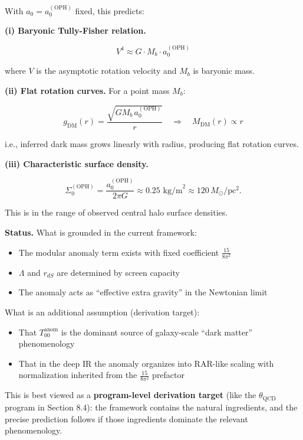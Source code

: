 \documentclass[
]{article}
\providecommand{\tightlist}{%
  \setlength{\itemsep}{0pt}\setlength{\parskip}{0pt}}
\begin{document}
With \(a_0 = a_0^{\mathrm{(OPH)}}\) fixed, this predicts:

\textbf{(i) Baryonic Tully-Fisher relation.}

\[
V^4 \approx G \cdot M_b \cdot a_0^{\mathrm{(OPH)}}
\]

where \(V\) is the asymptotic rotation velocity and \(M_b\) is baryonic
mass.

\textbf{(ii) Flat rotation curves.} For a point mass \(M_b\):

\[
g_{\mathrm{DM}}(r) = \frac{\sqrt{G M_b \, a_0^{\mathrm{(OPH)}}}}{r}
\quad \Rightarrow \quad
M_{\mathrm{DM}}(r) \propto r
\]

i.e., inferred dark mass grows linearly with radius, producing flat
rotation curves.

\textbf{(iii) Characteristic surface density.}

\[
\Sigma_0^{\mathrm{(OPH)}} = \frac{a_0^{\mathrm{(OPH)}}}{2\pi G}
\approx 0.25 \text{ kg/m}^2 \approx 120 \, M_\odot/\text{pc}^2.
\]

This is in the range of observed central halo surface densities.

\textbf{Status.} What is grounded in the current framework:

\begin{itemize}
\tightlist
\item
  The modular anomaly term exists with fixed coefficient
  \(\frac{15}{8\pi^2}\)
\item
  \(\Lambda\) and \(r_{dS}\) are determined by screen capacity
\item
  The anomaly acts as ``effective extra gravity'' in the Newtonian limit
\end{itemize}

What is an additional assumption (derivation target):

\begin{itemize}
\tightlist
\item
  That \(T_{00}^{\mathrm{anom}}\) is the dominant source of galaxy-scale
  ``dark matter'' phenomenology
\item
  That in the deep IR the anomaly organizes into RAR-like scaling with
  normalization inherited from the \(\frac{15}{8\pi^2}\) prefactor
\end{itemize}

This is best viewed as a \textbf{program-level derivation target} (like
the \(\theta_{\mathrm{QCD}}\) program in Section 8.4): the framework
contains the natural ingredients, and the precise prediction follows if
those ingredients dominate the relevant phenomenology.
\end{document}
